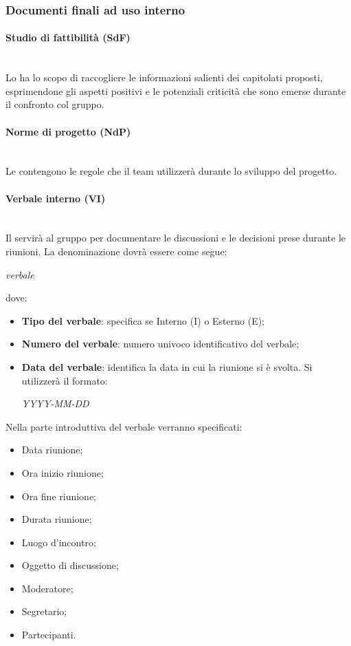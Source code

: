 	\subsubsection{Documenti finali ad uso interno}
		\paragraph{Studio di fattibilità (SdF)}
		~\\Lo \SdF{} ha lo scopo di raccogliere le informazioni salienti dei capitolati proposti, esprimendone gli aspetti positivi e 
		le potenziali criticità che sono emerse durante il confronto col gruppo.
		\paragraph{Norme di progetto (NdP)}
		~\\Le \NdP{} contengono le regole che il team utilizzerà durante lo sviluppo del progetto.
		\paragraph{Verbale interno (VI)}
		~\\Il \VI{} servirà al gruppo per documentare le discussioni e le decisioni prese durante le riunioni. 
		La denominazione dovrà essere come segue:\\
		\begin{center}
			\textit{verbale} 
		\end{center}
		dove:
		\begin{itemize}
			\item \textbf{Tipo del verbale}:
			specifica se Interno (I) o Esterno (E);
			\item \textbf{Numero del verbale}:
			numero univoco identificativo del verbale;
			\item \textbf{Data del verbale}:
			identifica la data in cui la riunione si è svolta. Si utilizzerà il formato:
			\begin{center}
				\emph{YYYY-MM-DD}
			\end{center}
		\end{itemize}
		Nella parte introduttiva del verbale verranno specificati:
		\begin{itemize}
			\item Data riunione;
			\item Ora inizio riunione;
			\item Ora fine riunione;
			\item Durata riunione;
			\item Luogo d'incontro;
			\item Oggetto di discussione;
			\item Moderatore;
			\item Segretario;
			\item Partecipanti.
		\end{itemize}

